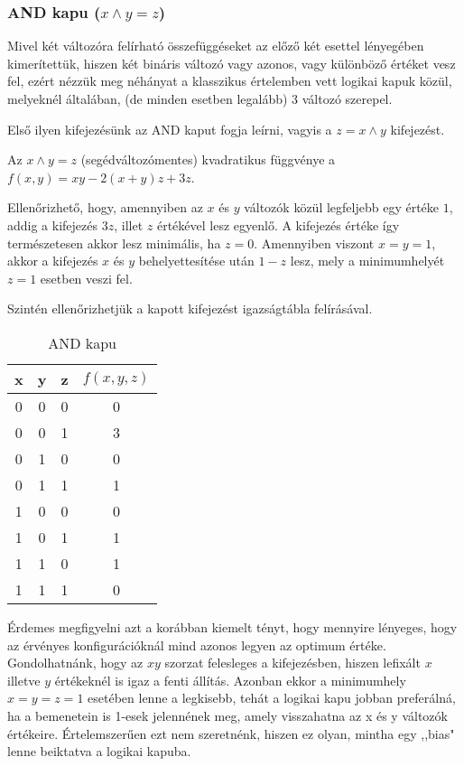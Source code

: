 \subsubsection{AND kapu ($x \wedge y = z$)}

Mivel két változóra felírható összefüggéseket az előző két esettel lényegében kimerítettük, hiszen két bináris változó vagy azonos, vagy különböző értéket vesz fel, ezért nézzük meg néhányat a klasszikus értelemben vett logikai kapuk közül, melyeknél általában, (de minden esetben legalább) 3 változó szerepel.


Első ilyen kifejezésünk az AND kaput fogja leírni, vagyis a $z=x \wedge y$ kifejezést.
\begin{allitas}
	Az $x \wedge y = z$ (segédváltozómentes) kvadratikus függvénye a $f(x,y)=xy-2(x+y)z+3z$.
	
	Ellenőrizhető, hogy, amennyiben az $x$ és $y$ változók közül legfeljebb egy értéke $1$, addig a kifejezés $3z$, illet $z$ értékével lesz egyenlő. A kifejezés értéke így természetesen akkor lesz minimális, ha $z=0$. Amennyiben viszont $x=y=1$, akkor a kifejezés $x$ és $y$ behelyettesítése után $1-z$ lesz, mely a minimumhelyét $z=1$ esetben veszi fel.	
\end{allitas}

Szintén ellenőrizhetjük a kapott kifejezést igazságtábla felírásával. 
\begin{table}[ht]
	\footnotesize
	\centering
	\begin{tabular}{ c c c c }
		\toprule
		x & y & z & $f(x,y,z)$ \\
		\midrule
		0 & 0 & 0 & 0 \\
		0 & 0 & 1 & 3 \\
		0 & 1 & 0 & 0 \\
		0 & 1 & 1 & 1 \\
		1 & 0 & 0 & 0 \\
		1 & 0 & 1 & 1 \\
		1 & 1 & 0 & 1 \\
		1 & 1 & 1 & 0 \\		
		\bottomrule
	\end{tabular}
	\caption{AND kapu}
	\label{tab:ANDgate}
\end{table}


Érdemes megfigyelni azt a korábban kiemelt tényt, hogy mennyire lényeges, hogy az érvényes konfigurációknál mind azonos legyen az optimum értéke. Gondolhatnánk, hogy az $xy$ szorzat felesleges a kifejezésben, hiszen lefixált $x$ illetve $y$ értékeknél is igaz a fenti állítás. Azonban ekkor a minimumhely $x=y=z=1$ esetében lenne a legkisebb, tehát a logikai kapu jobban preferálná, ha a bemenetein is 1-esek jelennének meg, amely visszahatna az x és y változók értékeire. Értelemszerűen ezt nem szeretnénk, hiszen ez olyan, mintha egy ,,bias" lenne beiktatva a logikai kapuba.


